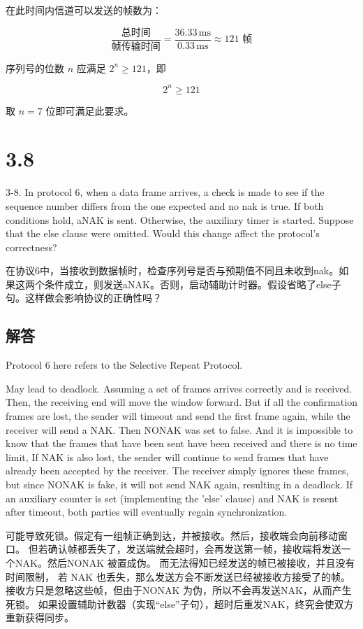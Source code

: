    在此时间内信道可以发送的帧数为：

   \[
   \frac{\text{总时间}}{\text{帧传输时间}} = \frac{36.33 \, \text{ms}}{0.33 \, \text{ms}} \approx 121 \text{ 帧}
   \]

   序列号的位数 \( n \) 应满足 \( 2^n \geq 121 \)，即

   \[
   2^n \geq 121
   \]

   取 \( n = 7 \) 位即可满足此要求。

\section{3.8}

3-8. In protocol 6, when a data frame arrives, a check is made to see if the sequence number differs from the one expected and no nak is true. If both conditions hold, aNAK is sent. Otherwise, the auxiliary timer is started. Suppose that the else clause were omitted. Would this change affect the protocol’s correctness?

在协议6中，当接收到数据帧时，检查序列号是否与预期值不同且未收到nak。如果这两个条件成立，则发送aNAK。否则，启动辅助计时器。假设省略了else子句。这样做会影响协议的正确性吗？

\subsection*{解答}

Protocol 6 here refers to the Selective Repeat Protocol.

May lead to deadlock. Assuming a set of frames arrives correctly and is received. Then, the receiving end will move the window forward.
But if all the confirmation frames are lost, the sender will timeout and send the first frame again, while the receiver will send a NAK. Then NONAK was set to false.
And it is impossible to know that the frames that have been sent have been received and there is no time limit,
If NAK is also lost, the sender will continue to send frames that have already been accepted by the receiver.
The receiver simply ignores these frames, but since NONAK is fake, it will not send NAK again, resulting in a deadlock.
If an auxiliary counter is set (implementing the 'else' clause) and NAK is resent after timeout, both parties will eventually regain synchronization.

可能导致死锁。假定有一组帧正确到达，并被接收。然后，接收端会向前移动窗口。 
但若确认帧都丢失了，发送端就会超时，会再发送第一帧，接收端将发送一个NAK。然后NONAK 被置成伪。
而无法得知已经发送的帧已被接收，并且没有时间限制，
若 NAK 也丢失，那么发送方会不断发送已经被接收方接受了的帧。
接收方只是忽略这些帧，但由于NONAK 为伪，所以不会再发送NAK，从而产生死锁。
如果设置辅助计数器（实现“else”子句），超时后重发NAK，终究会使双方重新获得同步。

